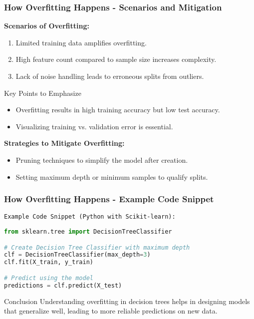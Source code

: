 \documentclass[aspectratio=169]{beamer}
\begin{document}
\begin{frame}[fragile]
  \frametitle{How Overfitting Happens - Scenarios and Mitigation}

  \textbf{Scenarios of Overfitting:}
  \begin{enumerate}
      \item Limited training data amplifies overfitting.
      \item High feature count compared to sample size increases complexity.
      \item Lack of noise handling leads to erroneous splits from outliers.
  \end{enumerate}
  
  \begin{block}{Key Points to Emphasize}
      \begin{itemize}
          \item Overfitting results in high training accuracy but low test accuracy.
          \item Visualizing training vs. validation error is essential.
      \end{itemize}
  \end{block}

  \textbf{Strategies to Mitigate Overfitting:}
  \begin{itemize}
      \item Pruning techniques to simplify the model after creation.
      \item Setting maximum depth or minimum samples to qualify splits.
  \end{itemize}
\end{frame}

\begin{frame}[fragile]
  \frametitle{How Overfitting Happens - Example Code Snippet}

  \texttt{Example Code Snippet (Python with Scikit-learn):}
  \begin{lstlisting}[language=Python]
from sklearn.tree import DecisionTreeClassifier

# Create Decision Tree Classifier with maximum depth
clf = DecisionTreeClassifier(max_depth=3)
clf.fit(X_train, y_train)

# Predict using the model
predictions = clf.predict(X_test)
  \end{lstlisting}

  \begin{block}{Conclusion}
      Understanding overfitting in decision trees helps in designing models that generalize well, leading to more reliable predictions on new data.
  \end{block}
\end{frame}
\end{document}
